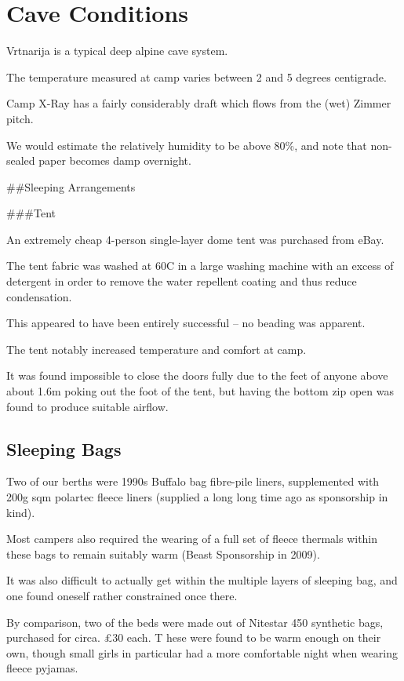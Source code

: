 \section{Cave Conditions}

Vrtnarija is a typical deep alpine cave system.

The temperature measured at camp varies between 2 and 5 degrees
centigrade.

Camp X-Ray has a fairly considerably draft which flows from the (wet)
Zimmer pitch.

We would estimate the relatively humidity to be above 80\%, and note
that non-sealed paper becomes damp overnight.

\#\#Sleeping Arrangements

\#\#\#Tent

An extremely cheap 4-person single-layer dome tent was purchased from
eBay.

The tent fabric was washed at 60C in a large washing machine with an
excess of detergent in order to remove the water repellent coating and
thus reduce condensation.

This appeared to have been entirely successful -- no beading was
apparent.

The tent notably increased temperature and comfort at camp.

It was found impossible to close the doors fully due to the feet of
anyone above about 1.6m poking out the foot of the tent, but having the
bottom zip open was found to produce suitable airflow.


\subsection{Sleeping Bags}

Two of our berths were 1990s Buffalo bag fibre-pile liners, supplemented
with 200g sqm polartec fleece liners (supplied a long long time ago as
sponsorship in kind).

Most campers also required the wearing of a full set of fleece thermals
within these bags to remain suitably warm (Beast Sponsorship in 2009).

It was also difficult to actually get within the multiple layers of
sleeping bag, and one found oneself rather constrained once there.

By comparison, two of the beds were made out of Nitestar 450 synthetic
bags, purchased for circa. £30 each. T hese were found to be warm enough
on their own, though small girls in particular had a more comfortable
night when wearing fleece pyjamas.

